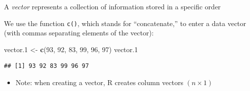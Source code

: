 \documentclass[ignorenonframetext,]{beamer}
\newenvironment{Shaded}{\begin{snugshade}}{\end{snugshade}}
\newcommand{\KeywordTok}[1]{\textcolor[rgb]{0.13,0.29,0.53}{\textbf{#1}}}
\newcommand{\DecValTok}[1]{\textcolor[rgb]{0.00,0.00,0.81}{#1}}
\newcommand{\StringTok}[1]{\textcolor[rgb]{0.31,0.60,0.02}{#1}}
\newcommand{\NormalTok}[1]{#1}
\providecommand{\tightlist}{%
	\setlength{\itemsep}{0pt}\setlength{\parskip}{0pt}}
\begin{document}
\begin{frame}[fragile]{A \emph{vector} represents a collection of
information stored in a specific order}

We use the function \texttt{c()}, which stands for ``concatenate,'' to
enter a data vector (with commas separating elements of the vector):

\begin{Shaded}
\begin{Highlighting}[]
\NormalTok{vector.}\DecValTok{1}\NormalTok{ <-}\StringTok{ }\KeywordTok{c}\NormalTok{(}\DecValTok{93}\NormalTok{, }\DecValTok{92}\NormalTok{, }\DecValTok{83}\NormalTok{, }\DecValTok{99}\NormalTok{, }\DecValTok{96}\NormalTok{, }\DecValTok{97}\NormalTok{)}
\NormalTok{vector.}\DecValTok{1}
\end{Highlighting}
\end{Shaded}

\begin{verbatim}
## [1] 93 92 83 99 96 97
\end{verbatim}

\begin{itemize}
\tightlist
\item
  Note: when creating a vector, R creates column vectors
  \((n \times 1)\)
\end{itemize}

\end{frame}
\end{document}
